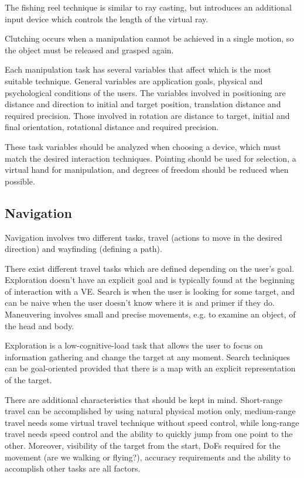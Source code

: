 \documentclass[a4paper]{article}
\begin{document}
The fishing reel technique is similar to ray casting, but introduces an
additional input device which controls the length of the virtual ray.

Clutching occurs when a manipulation cannot be achieved in a single
motion, so the object must be released and grasped again.

Each manipulation task has several variables that affect which is the
most suitable technique.
General variables are application goals,
physical and psychological conditions of the users.
The variables involved in positioning are distance and direction to initial and target position, translation distance and required precision.
Those involved in rotation are distance to target, initial and final orientation, rotational distance and required precision.

These task variables should be analyzed when choosing a device, which must match the desired interaction techniques.
Pointing should be used for selection, a virtual hand for manipulation, and degrees of freedom should be reduced when possible.

\subsection{Navigation}

Navigation involves two different tasks, travel (actions to move in the desired direction) and wayfinding (defining a path).

There exist different travel tasks which are defined depending on the user's goal.
Exploration doesn't have an explicit goal and is typically found at the beginning of interaction with a VE.
Search is when the user is looking for some target, and can be naive when the user doesn't know where it is and primer if they do.
Maneuvering involves small and precise movements, e.g. to examine an object, of the head and body.

Exploration is a low-cognitive-load task that allows the user to focus on information gathering and change the target at any moment.
Search techniques can be goal-oriented provided that there is a map with an explicit representation of the target.

There are additional characteristics that should be kept in mind.
Short-range travel can be accomplished by using natural physical motion only, medium-range travel needs some virtual travel technique without speed control, while long-range travel needs speed control and the ability to quickly jump from one point to the other.
Moreover, visibility of the target from the start, DoFs required for the movement (are we walking or flying?), accuracy requirements and the ability to accomplish other tasks are all factors.
\end{document}
